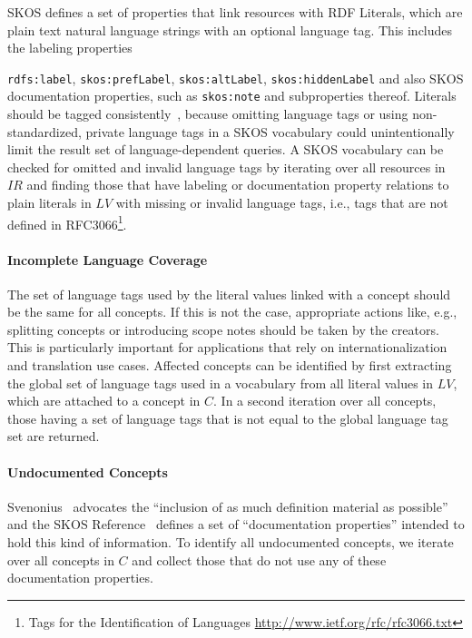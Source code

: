 SKOS defines a set of properties that link resources with RDF Literals, which are plain text natural language strings with an optional language tag. This includes the labeling properties {\texttt{rdfs:label}, \texttt{skos:prefLabel}, \texttt{skos:altLabel}, \texttt{skos:hiddenLabel} and also SKOS documentation properties, such as \texttt{skos:note} and subproperties thereof. Literals should be tagged consistently~\cite{Vrandecic2010}, because omitting language tags or using non-standardized, private language tags in a SKOS vocabulary could unintentionally limit the result set of language-dependent queries.
A SKOS vocabulary can be checked for omitted and invalid language tags by iterating over all resources in $IR$ and finding those that have labeling or documentation property relations to plain literals in $LV$ with missing or invalid language tags, i.e., tags that are not defined in RFC3066\footnote{Tags for the Identification of Languages \url{http://www.ietf.org/rfc/rfc3066.txt}}.

\paragraph{Incomplete Language Coverage}

The set of language tags used by the literal values linked with a concept should be the same for all concepts. If this is not the case, appropriate actions like, e.g., splitting concepts or introducing scope notes should be taken by the creators. This is particularly important for applications that rely on internationalization and translation use cases.
Affected concepts can be identified by first extracting the global set of language tags used in a vocabulary from all literal values in $LV$, which are attached to a concept in $C$. In a second iteration over all concepts, those having a set of language tags that is not equal to the global language tag set are returned.

\paragraph{Undocumented Concepts}

Svenonius~\cite{Svenonius1997} advocates the ``inclusion of as much definition material as possible'' and the SKOS Reference~\cite{SkosReference2008} defines a set of ``documentation properties'' intended to hold this kind of information.
To identify all undocumented concepts, we iterate over all concepts in $C$ and collect those that do not use any of these documentation properties.

}
